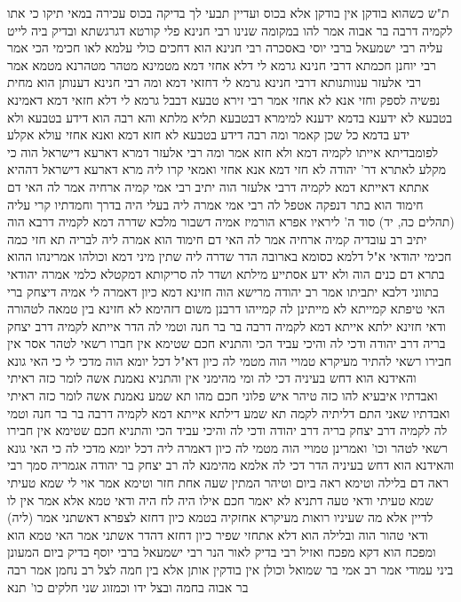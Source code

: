 \documentclass[12pt, openany]{book}
\begin{document}
{ת"ש  כשהוא בודקן אין בודקן אלא בכוס  ועדיין תבעי לך  בדיקה בכוס עכירה במאי  תיקו 
כי אתו לקמיה דרבה בר אבוה אמר להו  במקומה שנינו  רבי חנינא פלי קורטא דגרגשתא ובדיק ביה לייט עליה רבי ישמעאל ברבי יוסי באסכרה
רבי חנינא הוא דחכים כולי עלמא לאו חכימי הכי 
אמר רבי יוחנן  חכמתא דרבי חנינא גרמא לי דלא אחזי דמא מטמינא מטהר מטהרנא מטמא  אמר רבי אלעזר  ענוותנותא דרבי חנינא גרמא לי דחזאי דמא ומה רבי חנינא דענותן הוא מחית נפשיה לספק וחזי אנא לא אחזי 
אמר רבי זירא  טבעא דבבל גרמא לי דלא חזאי דמא דאמינא  בטבעא לא ידענא בדמא ידענא 
למימרא דבטבעא תליא מלתא והא רבה הוא דידע בטבעא ולא ידע בדמא  כל שכן קאמר ומה רבה דידע בטבעא לא חזא דמא ואנא אחזי 
עולא אקלע לפומבדיתא אייתו לקמיה דמא ולא חזא  אמר  ומה רבי אלעזר דמרא דארעא דישראל הוה כי מקלע לאתרא דר' יהודה לא חזי דמא אנא אחזי 
ואמאי קרו ליה מרא דארעא דישראל  דההיא אתתא דאייתא דמא לקמיה דרבי אלעזר הוה יתיב רבי אמי קמיה  ארחיה אמר לה  האי דם חימוד הוא  בתר דנפקה אטפל לה רבי אמי  אמרה ליה  בעלי היה בדרך וחמדתיו  קרי עליה  (תהלים כה, יד) סוד ה' ליראיו 
אפרא הורמיז אמיה דשבור מלכא שדרה דמא לקמיה דרבא הוה יתיב רב עובדיה קמיה ארחיה אמר לה  האי דם חימוד הוא  אמרה ליה לבריה  תא חזי כמה חכימי יהודאי  א"ל  דלמא כסומא בארובה 
הדר שדרה ליה שתין מיני דמא וכולהו אמרינהו  ההוא בתרא דם כנים הוה ולא ידע אסתייע מילתא ושדר לה סריקותא דמקטלא כלמי  אמרה  יהודאי בתווני דלבא יתביתו 
אמר רב יהודה  מרישא הוה חזינא דמא כיון דאמרה לי אמיה דיצחק ברי  האי טיפתא קמייתא לא מייתינן לה קמייהו דרבנן משום דזהימא לא חזינא
בין טמאה לטהורה ודאי חזינא 
ילתא אייתא דמא לקמיה דרבה בר בר חנה וטמי לה הדר אייתא לקמיה דרב יצחק בריה דרב יהודה ודכי לה 
והיכי עביד הכי  והתניא  חכם שטימא אין חברו רשאי לטהר אסר אין חבירו רשאי להתיר 
מעיקרא טמויי הוה מטמי לה כיון דא"ל  דכל יומא הוה מדכי לי כי האי גונא והאידנא הוא דחש בעיניה דכי לה 
ומי מהימני  אין  והתניא  נאמנת אשה לומר כזה ראיתי ואבדתיו 
איבעיא להו  כזה טיהר איש פלוני חכם מהו 
תא שמע  נאמנת אשה לומר כזה ראיתי ואבדתיו שאני התם דליתיה לקמה 
תא שמע  דילתא אייתא דמא לקמיה דרבה בר בר חנה וטמי לה  לקמיה דרב יצחק בריה דרב יהודה ודכי לה  והיכי עביד הכי  והתניא  חכם שטימא אין חבירו רשאי לטהר וכו' 
ואמרינן  טמויי הוה מטמי לה כיון דאמרה ליה דכל יומא מדכי לה כי האי גונא והאידנא הוא דחש בעיניה הדר דכי לה אלמא  מהימנא לה 
רב יצחק בר יהודה אגמריה סמך 
רבי ראה דם בלילה וטימא ראה ביום וטיהר המתין שעה אחת חזר וטימא אמר  אוי לי שמא טעיתי 
שמא טעיתי  ודאי טעה  דתניא  לא יאמר חכם אילו היה לח היה ודאי טמא
אלא אמר אין לו לדיין אלא מה שעיניו רואות  מעיקרא אחזקיה בטמא כיון דחזא לצפרא דאשתני אמר (ליה)  ודאי טהור הוה ובלילה הוא דלא אתחזי שפיר  כיון דחזא דהדר אשתני אמר  האי טמא הוא ומפכח הוא דקא מפכח ואזיל 
רבי בדיק לאור הנר רבי ישמעאל ברבי יוסף בדיק ביום המעונן ביני עמודי  אמר רב אמי בר שמואל  וכולן אין בודקין אותן אלא בין חמה לצל  רב נחמן אמר רבה בר אבוה  בחמה ובצל ידו
וכמזוג שני חלקים כו' תנא}
\end{document}
